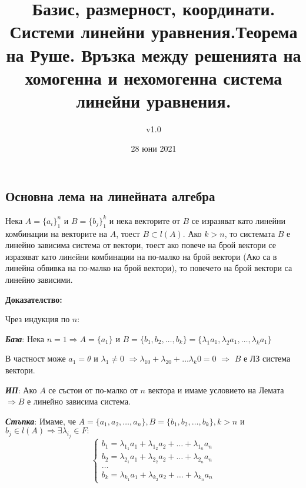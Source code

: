 \documentclass[fleqn,12pt]{article}
\title{Базис, размерност, координати.  Системи линейни уравнения.Теорема на Руше. Връзка между решенията на хомогенна и нехомогенна система линейни уравнения.}
\author{v1.0}
\date{28 юни 2021}
\begin{document}
\maketitle

\tableofcontents
\pagebreak

\begin{flushleft}

\section{Основна лема на линейната алгебра}
Нека $A = \{ a_i \}_1^n $ и $B = \{ b_j \}_1^k $ и нека векторите от $B$ се изразяват като линейни комбинации на векторите на $A$, тоест $B \subset l(A)$.
Ако $ k > n $, то системата $B$ е линейно зависима система от вектори, тоест ако повече на брой вектори се изразяват като линeйни комбинации на по-малко на брой вектори (Ако са в линейна обвивка на по-малко на брой вектори), то повечето на брой вектори са линейно зависими.

\vspace{5mm}

\textbf{Доказателство:}

Чрез индукция по $n$:

\vspace{5mm}

\textbf{\textit{База}}: Нека $ n = 1 \Rightarrow A = \{a_1\} $ и $ B = \{b_1, b_2, \dots, b_k \} = \{\lambda_1 a_1, \lambda_2 a_1, \dots, \lambda_k a_1 \} $

В частност може $ a_1 = \theta$ и $\lambda_1 \neq 0$ $ \Rightarrow \lambda_10 + \lambda_20 + \dots \lambda_k0 = 0$ $\Rightarrow$ $B$ е ЛЗ система вектори.

\vspace{5mm}

\textbf{\textit{ИП}}:  Ако $A$ се състои от по-малко от $n$ вектора и имаме условието на Лемата $ \Rightarrow B $ е линейно зависима система.

\textbf{\textit{Стъпка}}: Имаме, че $ A = \{a_1, a_2, \dots, a_n\}, B = \{b_1, b_2, \dots, b_k\}, k > n $ и $ b_j \in l(A) \Rightarrow \exists \lambda_{i_j} \in F:$
\begin{equation}
    \begin{cases}
        b_1 = \lambda_{1_1} a_1 + \lambda_{1_2} a_2 + \dots + \lambda_{1_n} a_n\\
        b_2 = \lambda_{2_1} a_1 + \lambda_{2_2} a_2 + \dots + \lambda_{2_n} a_n\\
        \dots\\
        b_k = \lambda_{k_1} a_1 + \lambda_{k_2} a_2 + \dots + \lambda_{k_n} a_n
    \end{cases}
\end{equation}


\end{flushleft}
\end{document}
